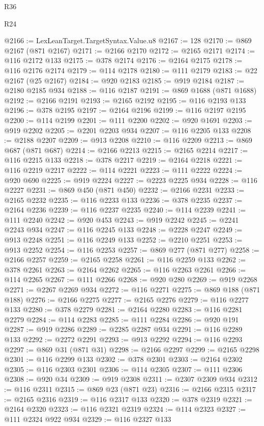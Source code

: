 \begin{lexlean}{R36}
\begin{lexlean}{R24}
\begin{coremodule}
{{{{{{{{{{{{{{{{{{{{{{{{{{{{{{{{{{{{{{{{{{{{{{{{{{{{{{{{{{{{{{{{{{{{{{{{{{{{{{{{{{{{{{{{{{{{{{{{{{{{{{{{{{{{{{{{{{{{{{{{{{{{{{{{{{{{{{{{{{{{{{{{{{{{{{{{{{{{{{{{{{{{{{{{{{{{{{{{{{{{{{{{{{{{{{{{{{{@2166 := LexLeanTarget.TargetSyntax.Value.u8
@2167 := 128
@2170 := @869 @2167 (@871 @2167)
@2171 := @2166 @2170
@2172 := @2165 @2171
@2174 := @116 @2172 @133
@2175 := @378 @2174
@2176 := @2164 @2175
@2178 := @116 @2176 @2174
@2179 := @114 @2178
@2180 := @111 @2179
@2183 := @22 @2167 (@25 @2167)
@2184 := @920 @2183
@2185 := @919 @2184
@2187 := @2180 @2185 @934
@2188 := @116 @2187
@2191 := @869 @1688 (@871 @1688)
@2192 := @2166 @2191
@2193 := @2165 @2192
@2195 := @116 @2193 @133
@2196 := @378 @2195
@2197 := @2164 @2196
@2199 := @116 @2197 @2195
@2200 := @114 @2199
@2201 := @111 @2200
@2202 := @920 @1691
@2203 := @919 @2202
@2205 := @2201 @2203 @934
@2207 := @116 @2205 @133
@2208 := @2188 @2207
@2209 := @913 @2208
@2210 := @116 @2209
@2213 := @869 @687 (@871 @687)
@2214 := @2166 @2213
@2215 := @2165 @2214
@2217 := @116 @2215 @133
@2218 := @378 @2217
@2219 := @2164 @2218
@2221 := @116 @2219 @2217
@2222 := @114 @2221
@2223 := @111 @2222
@2224 := @920 @690
@2225 := @919 @2224
@2227 := @2223 @2225 @934
@2228 := @116 @2227
@2231 := @869 @450 (@871 @450)
@2232 := @2166 @2231
@2233 := @2165 @2232
@2235 := @116 @2233 @133
@2236 := @378 @2235
@2237 := @2164 @2236
@2239 := @116 @2237 @2235
@2240 := @114 @2239
@2241 := @111 @2240
@2242 := @920 @453
@2243 := @919 @2242
@2245 := @2241 @2243 @934
@2247 := @116 @2245 @133
@2248 := @2228 @2247
@2249 := @913 @2248
@2251 := @116 @2249 @133
@2252 := @2210 @2251
@2253 := @913 @2252
@2254 := @116 @2253
@2257 := @869 @277 (@871 @277)
@2258 := @2166 @2257
@2259 := @2165 @2258
@2261 := @116 @2259 @133
@2262 := @378 @2261
@2263 := @2164 @2262
@2265 := @116 @2263 @2261
@2266 := @114 @2265
@2267 := @111 @2266
@2268 := @920 @280
@2269 := @919 @2268
@2271 := @2267 @2269 @934
@2272 := @116 @2271
@2275 := @869 @188 (@871 @188)
@2276 := @2166 @2275
@2277 := @2165 @2276
@2279 := @116 @2277 @133
@2280 := @378 @2279
@2281 := @2164 @2280
@2283 := @116 @2281 @2279
@2284 := @114 @2283
@2285 := @111 @2284
@2286 := @920 @191
@2287 := @919 @2286
@2289 := @2285 @2287 @934
@2291 := @116 @2289 @133
@2292 := @2272 @2291
@2293 := @913 @2292
@2294 := @116 @2293
@2297 := @869 @31 (@871 @31)
@2298 := @2166 @2297
@2299 := @2165 @2298
@2301 := @116 @2299 @133
@2302 := @378 @2301
@2303 := @2164 @2302
@2305 := @116 @2303 @2301
@2306 := @114 @2305
@2307 := @111 @2306
@2308 := @920 @34
@2309 := @919 @2308
@2311 := @2307 @2309 @934
@2312 := @116 @2311
@2315 := @869 @23 (@871 @23)
@2316 := @2166 @2315
@2317 := @2165 @2316
@2319 := @116 @2317 @133
@2320 := @378 @2319
@2321 := @2164 @2320
@2323 := @116 @2321 @2319
@2324 := @114 @2323
@2327 := @111 @2324 @922 @934
@2329 := @116 @2327 @133
}}}}}}}}}}}}}}}}}}}}}}}}}}}}}}}}}}}}}}}}}}}}}}}}}}}}}}}}}}}}}}}}}}}}}}}}}}}}}}}}}}}}}}}}}}}}}}}}}}}}}}}}}}}}}}}}}}}}}}}}}}}}}}}}}}}}}}}}}}}}}}}}}}}}}}}}}}}}}}}}}}}}}}}}}}}}}}}}}}}}}}}}}}}}}}}}}}}
\end{coremodule}
\end{lexlean}
\end{lexlean}
